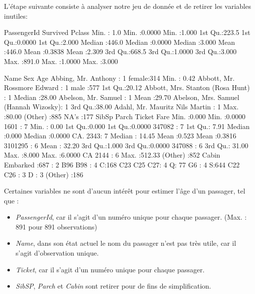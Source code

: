 \documentclass[11pt,french]{report}
\begin{document}
L'étape suivante consiste à analyser notre jeu de donnée et de retirer les variables inutiles:
\begin{Schunk}
\begin{Soutput}
  PassengerId       Survived          Pclass     
 Min.   :  1.0   Min.   :0.0000   Min.   :1.000  
 1st Qu.:223.5   1st Qu.:0.0000   1st Qu.:2.000  
 Median :446.0   Median :0.0000   Median :3.000  
 Mean   :446.0   Mean   :0.3838   Mean   :2.309  
 3rd Qu.:668.5   3rd Qu.:1.0000   3rd Qu.:3.000  
 Max.   :891.0   Max.   :1.0000   Max.   :3.000  
                                                 
                                    Name         Sex           Age       
 Abbing, Mr. Anthony                  :  1   female:314   Min.   : 0.42  
 Abbott, Mr. Rossmore Edward          :  1   male  :577   1st Qu.:20.12  
 Abbott, Mrs. Stanton (Rosa Hunt)     :  1                Median :28.00  
 Abelson, Mr. Samuel                  :  1                Mean   :29.70  
 Abelson, Mrs. Samuel (Hannah Wizosky):  1                3rd Qu.:38.00  
 Adahl, Mr. Mauritz Nils Martin       :  1                Max.   :80.00  
 (Other)                              :885                NA's   :177    
     SibSp           Parch             Ticket         Fare       
 Min.   :0.000   Min.   :0.0000   1601    :  7   Min.   :  0.00  
 1st Qu.:0.000   1st Qu.:0.0000   347082  :  7   1st Qu.:  7.91  
 Median :0.000   Median :0.0000   CA. 2343:  7   Median : 14.45  
 Mean   :0.523   Mean   :0.3816   3101295 :  6   Mean   : 32.20  
 3rd Qu.:1.000   3rd Qu.:0.0000   347088  :  6   3rd Qu.: 31.00  
 Max.   :8.000   Max.   :6.0000   CA 2144 :  6   Max.   :512.33  
                                  (Other) :852                   
         Cabin     Embarked
            :687    :  2   
 B96 B98    :  4   C:168   
 C23 C25 C27:  4   Q: 77   
 G6         :  4   S:644   
 C22 C26    :  3           
 D          :  3           
 (Other)    :186           
\end{Soutput}
\end{Schunk}

\bigskip
Certaines variables ne sont d'aucun intérêt pour estimer l'âge d'un passager, tel que :
\begin{itemize}
\item \emph{PassengerId}, car il s'agit d'un numéro unique pour chaque passager. (Max. : 891 pour 891 observations)
\item \emph{Name}, dans son état actuel le nom du passager n'est pas très utile, car il s'agit d'observation unique.
\item \emph{Ticket}, car il s'agit d'un numéro unique pour chaque passager.
\item \emph{SibSP}, \emph{Parch} et \emph{Cabin} sont retirer pour de fins de simplification. 
\end{itemize}
\end{document}
